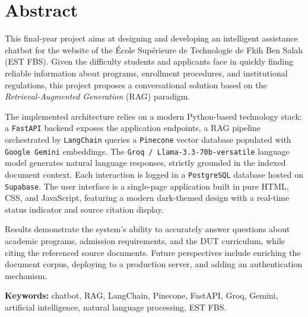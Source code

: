 \documentclass[12pt, a4paper, twoside]{report}
\newcommand{\tech}[1]{\texttt{\color{accent}#1}}
\newcommand{\term}[1]{\textit{\color{primary}#1}}
\begin{document}
\cleardoublepage

\chapter*{Abstract}

This final-year project aims at designing and developing an intelligent assistance chatbot for the website of the École Supérieure de Technologie de Fkih Ben Salah (EST FBS). Given the difficulty students and applicants face in quickly finding reliable information about programs, enrollment procedures, and institutional regulations, this project proposes a conversational solution based on the \term{Retrieval-Augmented Generation} (RAG) paradigm.

The implemented architecture relies on a modern Python-based technology stack: a \tech{FastAPI} backend exposes the application endpoints, a RAG pipeline orchestrated by \tech{LangChain} queries a \tech{Pinecone} vector database populated with \tech{Google Gemini} embeddings. The \tech{Groq / Llama-3.3-70b-versatile} language model generates natural language responses, strictly grounded in the indexed document context. Each interaction is logged in a \tech{PostgreSQL} database hosted on \tech{Supabase}. The user interface is a single-page application built in pure HTML, CSS, and JavaScript, featuring a modern dark-themed design with a real-time status indicator and source citation display.

Results demonstrate the system's ability to accurately answer questions about academic programs, admission requirements, and the DUT curriculum, while citing the referenced source documents. Future perspectives include enriching the document corpus, deploying to a production server, and adding an authentication mechanism.

\vspace{0.8cm}
\noindent\textbf{Keywords:} chatbot, RAG, LangChain, Pinecone, FastAPI, Groq, Gemini, artificial intelligence, natural language processing, EST FBS.

\cleardoublepage

\tableofcontents
\cleardoublepage

\listoffigures
{}
\cleardoublepage
\end{document}
